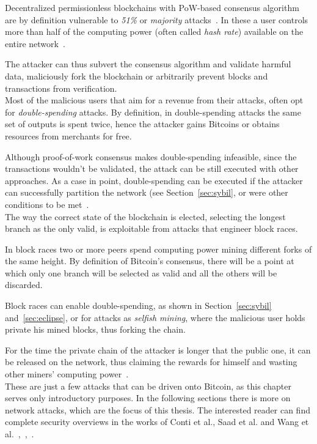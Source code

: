 \documentclass[12pt, letterpaper, twoside]{article}
\begin{document}
Decentralized permissionless blockchains with PoW-based consensus algorithm are by definition vulnerable to \textit{51\%} or \textit{majority} attacks~\cite{nakamoto}. In these a user controls more than half of the computing power (often called \textit{hash rate}) available on the entire network~\cite{51atk}.

The attacker can thus subvert the consensus algorithm and validate harmful data, maliciously fork the blockchain or arbitrarily prevent blocks and transactions from verification.\\

Most of the malicious users that aim for a revenue from their attacks, often opt for \textit{double-spending} attacks. By definition, in double-spending attacks the same set of outputs is spent twice, hence the attacker gains Bitcoins or obtains resources from merchants for free.

Although proof-of-work consensus makes double-spending infeasible, since the transactions wouldn't be validated, the attack can be still executed with other approaches. As a case in point, double-spending can be executed  if the attacker can successfully partition the network (see Section~\ref{sec:sybil}, or were other conditions to be met~\cite{doublespendfastpay}.\\

The way the correct state of the blockchain is elected, selecting the longest branch as the only valid, is exploitable from attacks that engineer block races.

In block races two or more peers spend computing power mining different forks of the same height. By definition of Bitcoin's consensus, there will be a point at which only one branch will be selected as valid and all the others will be discarded.

Block races can enable double-spending, as shown in Section~\ref{sec:sybil} and~\ref{sec:eclipse}, or for attacks as \textit{selfish mining}, where the malicious user holds private his mined blocks, thus forking the chain.

For the time the private chain of the attacker is longer that the public one, it can be released on the network, thus claiming the rewards for himself and wasting other miners' computing power~\cite{selfishmining}.\\

These are just a few attacks that can be driven onto Bitcoin, as this chapter serves only introductory purposes. In the following sections there is more on network attacks, which are the focus of this thesis. The interested reader can find complete security overviews in the works of Conti et al., Saad et al. and Wang et al.~\cite{contiatksurvey},~\cite{saad2019attacksurface},~\cite{secpermissionlessblock}.
\end{document}
